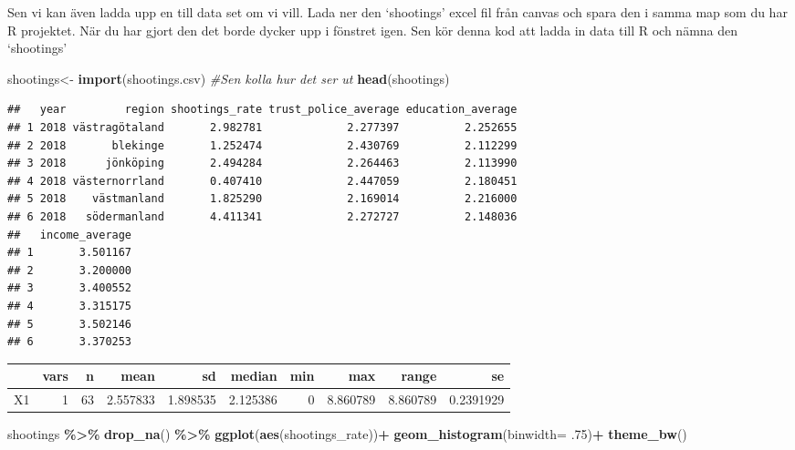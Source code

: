 \documentclass[
]{book}
\newenvironment{Shaded}{\begin{snugshade}}{\end{snugshade}}
\newcommand{\AttributeTok}[1]{\textcolor[rgb]{0.13,0.29,0.53}{#1}}
\newcommand{\CommentTok}[1]{\textcolor[rgb]{0.56,0.35,0.01}{\textit{#1}}}
\newcommand{\ConstantTok}[1]{\textcolor[rgb]{0.56,0.35,0.01}{#1}}
\newcommand{\DecValTok}[1]{\textcolor[rgb]{0.00,0.00,0.81}{#1}}
\newcommand{\FunctionTok}[1]{\textcolor[rgb]{0.13,0.29,0.53}{\textbf{#1}}}
\newcommand{\NormalTok}[1]{#1}
\newcommand{\OtherTok}[1]{\textcolor[rgb]{0.56,0.35,0.01}{#1}}
\newcommand{\SpecialCharTok}[1]{\textcolor[rgb]{0.81,0.36,0.00}{\textbf{#1}}}
\newcommand{\StringTok}[1]{\textcolor[rgb]{0.31,0.60,0.02}{#1}}
\begin{document}
Sen vi kan även ladda upp en till data set om vi vill. Lada ner den
`shootings' excel fil från canvas och spara den i samma map som du har R
projektet. När du har gjort den det borde dycker upp i fönstret igen.
Sen kör denna kod att ladda in data till R och nämna den `shootings'

\begin{Shaded}
\begin{Highlighting}[]
\NormalTok{shootings}\OtherTok{\textless{}{-}} \FunctionTok{import}\NormalTok{(}\StringTok{\textquotesingle{}shootings.csv\textquotesingle{}}\NormalTok{)}
\CommentTok{\#Sen kolla hur det ser ut}
\FunctionTok{head}\NormalTok{(shootings)}
\end{Highlighting}
\end{Shaded}

\begin{verbatim}
##   year         region shootings_rate trust_police_average education_average
## 1 2018 västragötaland       2.982781             2.277397          2.252655
## 2 2018       blekinge       1.252474             2.430769          2.112299
## 3 2018      jönköping       2.494284             2.264463          2.113990
## 4 2018 västernorrland       0.407410             2.447059          2.180451
## 5 2018    västmanland       1.825290             2.169014          2.216000
## 6 2018   södermanland       4.411341             2.272727          2.148036
##   income_average
## 1       3.501167
## 2       3.200000
## 3       3.400552
## 4       3.315175
## 5       3.502146
## 6       3.370253
\end{verbatim}

\begin{Shaded}
\end{Shaded}

\begin{tabular}{l|r|r|r|r|r|r|r|r|r}
\hline
  & vars & n & mean & sd & median & min & max & range & se\\
\hline
X1 & 1 & 63 & 2.557833 & 1.898535 & 2.125386 & 0 & 8.860789 & 8.860789 & 0.2391929\\
\hline
\end{tabular}

\begin{Shaded}
\begin{Highlighting}[]
\NormalTok{shootings }\SpecialCharTok{\%\textgreater{}\%} \FunctionTok{drop\_na}\NormalTok{() }\SpecialCharTok{\%\textgreater{}\%} 
  \FunctionTok{ggplot}\NormalTok{(}\FunctionTok{aes}\NormalTok{(shootings\_rate))}\SpecialCharTok{+} \FunctionTok{geom\_histogram}\NormalTok{(}\AttributeTok{binwidth=}\NormalTok{ .}\DecValTok{75}\NormalTok{)}\SpecialCharTok{+}
   \FunctionTok{theme\_bw}\NormalTok{()}
\end{Highlighting}
\end{Shaded}
\end{document}

